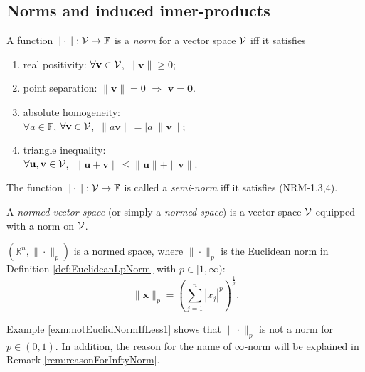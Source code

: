 \subsection{Norms and induced inner-products}
\label{sec:normed-vector-spaces}

\begin{defn}
  \label{def:norm}
  A function $\|\cdot\|: {\cal V}\rightarrow\mathbb{F}$
  is a \emph{norm} for a vector space ${\cal V}$ iff it satisfies
  \begin{enumerate}[(NRM-1)]
    \itemsep0em
  \item real positivity: 
    $\forall \mathbf{v}\in{\cal V}$, 
    $\|\mathbf{v}\| \ge 0$;
  \item point separation:
    $\|\mathbf{v}\|=0$ $\Rightarrow$ $\mathbf{v}=\mathbf{0}$.
  \item absolute homogeneity: \\
    $\forall a\in \mathbb{F}$,
    $\forall \mathbf{v}\in{\cal V}$,\ 
    $\|a\mathbf{v}\|=|a|\|\mathbf{v}\|$;
  \item triangle inequality:\\
    $\forall \mathbf{u},\mathbf{v}\in{\cal V}$,\ 
    $\|\mathbf{u}+\mathbf{v}\|\le\|\mathbf{u}\|+\|\mathbf{v}\|$.
  \end{enumerate}
  The function $\|\cdot\|: {\cal V}\rightarrow\mathbb{F}$
  is called a \emph{semi-norm} iff
  it satisfies (NRM-1,3,4).
\end{defn}

\begin{defn}
  \label{def:normedSpace}
  A \emph{normed vector space} (or simply a \emph{normed space})
  is a vector space ${\cal V}$
  equipped with a norm on ${\cal V}$.
\end{defn}

\begin{exm}
  \label{exm:RdEuclideanSpace}
  $\left(\mathbb{R}^n, \|\cdot\|_p\right)$
  is a normed space, 
  where $\|\cdot\|_p$ is the Euclidean norm
  in Definition \ref{def:EuclideanLpNorm}
  with $p\in[1,\infty)$: 
  \begin{displaymath}
    \|\mathbf{x}\|_p= \left(\sum_{j=1}^n |x_j|^p\right)^{\frac{1}{p}}.
  \end{displaymath}
\end{exm}

\begin{rem}
  Example \ref{exm:notEuclidNormIfLess1}
  shows that $\|\cdot\|_p$ is not a norm for $p\in(0,1)$.
  In addition, the reason for the name of $\infty$-norm
  will be explained in Remark \ref{rem:reasonForInftyNorm}.
\end{rem}

